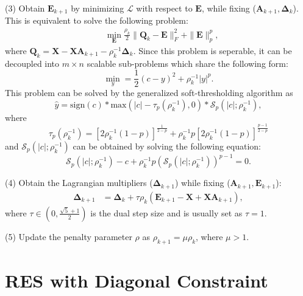 \documentclass[10pt,twocolumn,letterpaper]{article}
\begin{document}
(3) Obtain $\bm{E}_{k+1}$ by minimizing $\mathcal{L}$ with respect to $\bm{E}$, while fixing ($\bm{A}_{k+1},\bm{\Delta}_{k}$). This is equivalent to solve the following problem:
\begin{equation}
\begin{split}
\label{e9}
&
\min_{\bm{E}}
\frac{\rho_{k}}{2}
\|
\bm{Q}_{k}
-
\bm{E}
\|_{F}^{2}
+
\|
\bm{E}
\|_{p}^{p},
\end{split}
\end{equation}
where $\bm{Q}_{k}=\bm{X}-\bm{X}\bm{A}_{k+1}-\rho_{k}^{-1}\bm{\Delta}_{k}$. Since this problem is seperable, it can be decoupled into $m\times n$ scalable sub-problems which share the following form:
\begin{equation}
\label{e10}
\min_{y}
=
\frac{1}{2}
(c-y)^{2}
+
\rho_{k}^{-1}
|y|^{p}.
\end{equation}
This problem can be solved by the generalized soft-thresholding algorithm \cite{gis} as
\begin{equation}
\hat{y}
=
\text{sign}(c)*\text{max}(|c|-\tau_{p}(\rho_{k}^{-1}),0)*\mathcal{S}_{p}(|c|;\rho_{k}^{-1}),
\end{equation}
where 
\begin{equation}
\tau_{p}(\rho_{k}^{-1})
=
[2\rho_{k}^{-1}(1-p)]^{\frac{1}{2-p}}
+
\rho_{k}^{-1}p[2\rho_{k}^{-1}(1-p)]^{\frac{p-1}{2-p}}
\end{equation}
and $\mathcal{S}_{p}(|c|;\rho_{k}^{-1})$ can be obtained by solving the following equation:
\begin{equation}
\mathcal{S}_{p}(|c|;\rho_{k}^{-1})
-
c
+
\rho_{k}^{-1}p
(\mathcal{S}_{p}(|c|;\rho_{k}^{-1}))^{p-1}
=
0
.
\end{equation}


(4) Obtain the Lagrangian multipliers ($\bm{\Delta}_{k+1}$) while fixing ($\bm{A}_{k+1},\bm{E}_{k+1}$):
\begin{equation}
\begin{split}
\label{e10}
\bm{\Delta}_{k+1}
&
=
\bm{\Delta}_{k}
+
\tau\rho_{k}
(\bm{E}_{k+1}-\bm{X}+\bm{X}\bm{A}_{k+1})
,
\end{split}
\end{equation}
where $\tau\in(0,\frac{\sqrt{5}+1}{2})$ is the dual step size and is usually set as $\tau=1$.

(5) Update the penalty parameter $\rho$ as $\rho_{k+1}=\mu\rho_{k}$, where $\mu>1$.

\section{RES with Diagonal Constraint}
\end{document}
